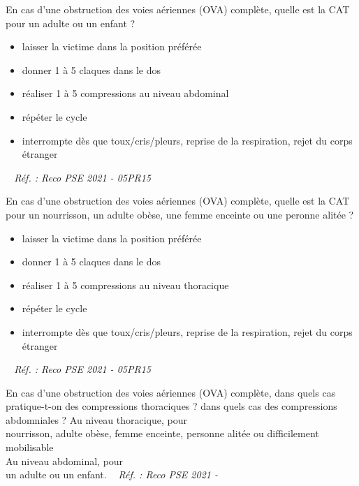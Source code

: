 \documentclass[grid,avery5371,landscape]{flashcards}
\makeatletter
\newcounter{nocarte}
\newcommand{\categ}[1]{%
  \def\@categ{#1}%
  \setcounter{nocarte}{0}%
}
\newcommand{\source}[1]{%
  \medskip
  \itshape%
   ~ \hfill Réf. : #1}
\makeatother
\begin{document}
\color[HTML]{003273}
\categ{PSE}
\begin{flashcard}[CAT]{
 En cas d'une obstruction des voies aériennes (OVA) complète, quelle est la CAT pour un adulte ou un enfant ?   }
  \begin{itemize} \item laisser la victime dans la position préférée \item donner 1 à 5 claques dans le dos \item réaliser 1 à 5 compressions au niveau abdominal \item répéter le cycle \item interrompte dès que toux/cris/pleurs, reprise de la respiration, rejet du corps étranger \end{itemize}
  \source{Reco PSE 2021 - 05PR15}
\end{flashcard}


\color[HTML]{003273}
\categ{PSE}
\begin{flashcard}[CAT]{
 En cas d'une obstruction des voies aériennes (OVA) complète, quelle est la CAT pour un nourrisson, un adulte obèse, une femme enceinte ou une peronne alitée ?   }
  \begin{itemize} \item laisser la victime dans la position préférée \item donner 1 à 5 claques dans le dos \item réaliser 1 à 5 compressions au niveau thoracique \item répéter le cycle \item interrompte dès que toux/cris/pleurs, reprise de la respiration, rejet du corps étranger \end{itemize}
  \source{Reco PSE 2021 - 05PR15}
\end{flashcard}


\color[HTML]{003273}
\categ{PSE}
\begin{flashcard}[CAT]{
 En cas d'une obstruction des voies aériennes (OVA) complète, dans quels cas pratique-t-on des compressions thoraciques ? dans quels cas des compressions abdomniales ?   }
  Au niveau thoracique, pour \\ nourrisson, adulte obèse, femme enceinte, personne alitée ou difficilement mobilisable \\ Au niveau abdominal, pour \\ un adulte ou un enfant. 
  \source{Reco PSE 2021 - }
\end{flashcard}
\end{document}
